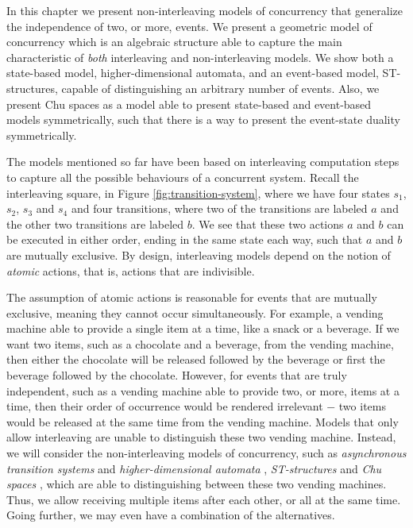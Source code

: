 In this chapter we present non-interleaving models of concurrency that generalize the independence of two, or more, events. We present a geometric model of concurrency which is an algebraic structure able to capture the main characteristic of \emph{both} interleaving and non-interleaving models. We show both a state-based model, higher-dimensional automata, and an event-based model, ST-structures, capable of distinguishing an arbitrary number of events. Also, we present Chu spaces as a model able to present state-based and event-based models symmetrically, such that there is a way to present the event-state duality symmetrically. 

The models mentioned so far have been based on interleaving computation steps to capture all the possible behaviours of a concurrent system. Recall the interleaving square, in Figure \ref{fig:transition-system}, where we have four states $s_{1}$, $s_{2}$, $s_{3}$ and $s_{4}$ and four transitions, where two of the transitions are labeled $a$ and the other two transitions are labeled $b$. We see that these two actions $a$ and $b$ can be executed in either order, ending in the same state each way, such that $a$ and $b$ are mutually exclusive. By design, interleaving models depend on the notion of \emph{atomic} actions, that is, actions that are indivisible.

The assumption of atomic actions is reasonable for events that are mutually exclusive, meaning they cannot occur simultaneously. For example, a vending machine able to provide a single item at a time, like a snack or a beverage. If we want two items, such as a chocolate and a beverage, from the vending machine, then either the chocolate will be released followed by the beverage or first the beverage followed by the chocolate. However, for events that are truly independent, such as a vending machine able to provide two, or more, items at a time, then their order of occurrence would be rendered irrelevant $-$ two items would be released at the same time from the vending machine. Models that only allow interleaving are unable to distinguish these two vending machine. Instead, we will consider the non-interleaving models of concurrency, such as \emph{asynchronous transition systems} \cite{winskel95modelsCategory} and \emph{higher-dimensional automata} \cite{pratt91hda}, \emph{ST-structures} \cite{Johansen16STstruct} and \emph{Chu spaces} \cite{gupta94phd_Chu}, which are able to distinguishing between these two vending machines. Thus, we allow receiving multiple items after each other, or all at the same time. Going further, we may even have a combination of the alternatives.

